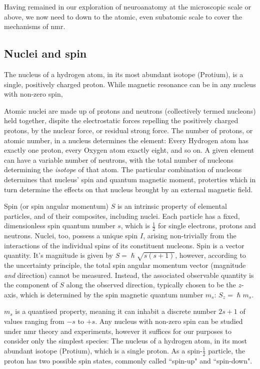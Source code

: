 Having remained in our exploration of neuroanatomy at the microscopic scale or above, we now need to  down to the atomic, even subatomic scale to cover the mechanisms of \gls{nmr}.

\subsection{Nuclei and spin}

The nucleus of a hydrogen atom, in its most abundant isotope (Protium), is a single, positively charged proton.
While magnetic resonance can be  in any nucleus with non-zero spin,

Atomic nuclei are made up of protons and neutrons (collectively termed nucleons) held together, dispite the electrostatic forces repelling the positively charged protons, by the nuclear force, or residual strong force.
The number of protons, or atomic number, in a nucleus determines the element: Every Hydrogen atom has exactly one proton, every Oxygen atom exactly eight, and so on.
A given element can have a variable number of neutrons, with the total number of nucleons determining the \textit{isotope} of that atom.
The particular combination of nucleons determines that nucleus' spin and quantum magnetic moment, proterties which in turn determine the effects on that nucleus brought by an external magnetic field.

Spin (or spin angular momentum) $S$ is an intrinsic property of elemental particles, and of their composites, including nuclei.
Each particle has a fixed, dimensionless spin quantum number $s$, which is $\frac{1}{2}$ for single electrons, protons and neutrons.
Nuclei, too, possess a unique spin $I$, arising non-trivially from the interactions of the individual spins of its constituent nucleons.
Spin is a vector quantity.
It's magnitude is given by $S = \hslash \sqrt{s(s+1)}$, however, according to the uncertainty principle, the total spin angular momentum vector (magnitude \textit{and} direction) cannot be measured.
Instead, the associated observable quantity is the component of $S$ along the observed direction, typically chosen to be the $z$-axis, which is determined by the spin magnetic quantum number $m_s$: $S_z = \hslash m_s$.

$m_s$ is a quantised property, meaning it can inhabit a discrete number $2s+1$ of values ranging from $-s$ to $+s$.
Any nucleus with non-zero spin can be studied under \gls{nmr} theory and experiments, however it suffices for our purposes to consider only the simplest species:
The nucleus of a hydrogen atom, in its most abundant isotope (Protium), which is a single proton.
As a spin-$\frac{1}{2}$ particle, the proton has two possible spin states, commonly called ``spin-up" and ``spin-down".


